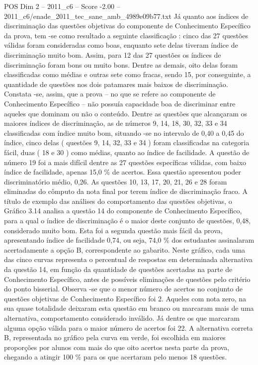 \begin{textsample}{POS Dim 2 – 2011\_c6 – Score -2.00 – 2011\_c6/enade\_2011\_tec\_sane\_amb\_4989e09b77.txt}
Já quanto aos índices de discriminação das questões objetivas do componente de Conhecimento Específico da prova, tem -se como resultado a seguinte classificação : cinco das 27 questões válidas foram consideradas como boas, enquanto sete delas tiveram índice de discriminação muito bom.
Assim, para 12 das 27 questões os índices de discriminação foram bons ou muito bons.
Dentre as demais, oito delas foram classificadas como médias e outras sete como fracas, sendo 15, por conseguinte, a quantidade de questões nos dois patamares mais baixos de discriminação.
Constata -se, assim, que a prova – no que se refere ao componente de Conhecimento Específico – não possuía capacidade boa de discriminar entre aqueles que dominam ou não o conteúdo.
Dentre as questões que alcançaram os maiores índices de discriminação, as de números 9, 14, 18, 30, 32, 33 e 34 classificadas com índice muito bom, situando -se no intervalo de 0,40 a 0,45 do índice, cinco delas ( questões 9, 14, 32, 33 e 34 ) foram classificadas na categoria fácil, duas ( 18 e 30 ) como médias, quanto ao índice de facilidade.
A questão de número 19 foi a mais difícil dentre as 27 questões específicas válidas, com baixo índice de facilidade, apenas 15,0 \% de acertos.
Essa questão apresentou poder discriminatório médio, 0,26.
As questões 10, 13, 17, 20, 21, 26 e 28 foram eliminadas do cômputo da nota final por terem índice de discriminação fraco.
A título de exemplo das análises do comportamento das questões objetivas, o Gráfico 3.14 analisa a questão 14 do componente de Conhecimento Específico, para a qual o índice de discriminação é o maior deste conjunto de questões, 0,48, considerado muito bom.
Esta foi a segunda questão mais fácil da prova, apresentando índice de facilidade 0,74, ou seja, 74,0 \% dos estudantes assinalaram acertadamente a opção B, correspondente ao gabarito.
Neste gráfico, cada uma das cinco curvas representa o percentual de respostas em determinada alternativa da questão 14, em função da quantidade de questões acertadas na parte de Conhecimento Específico, antes de possíveis eliminações de questões pelo critério do ponto bisserial.
Observa -se que o menor número de acertos no conjunto de questões objetivas de Conhecimento Específico foi 2.
Aqueles com nota zero, na sua quase totalidade deixaram esta questão em branco ou marcaram mais de uma alternativa, comportamento considerado inválido.
Já dentre os que marcaram alguma opção válida para o maior número de acertos foi 22.
A alternativa correta B, representada no gráfico pela curva em verde, foi escolhida em maiores proporções por alunos com mais do que oito acertos nesta parte da prova, chegando a atingir 100 \% para os que acertaram pelo menos 18 questões.

\end{textsample}
